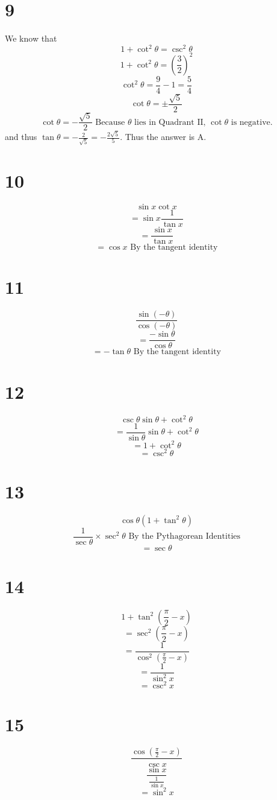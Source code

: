 \documentclass{article}
\theoremstyle{definition}
\newcommand{\?}{\stackrel{?}{=}}
\begin{document}
\section*{9}
We know that
\[ 1+\cot^2\theta=\csc^2\theta \]
\[ 1+\cot^2\theta=(\frac{3}{2})^2 \]
\[ \cot^2\theta=\frac{9}{4}-1=\frac{5}{4} \]
\[ \cot\theta=\pm\frac{\sqrt{5}}{2} \]
\[ \cot\theta=-\frac{\sqrt{5}}{2}\textrm{ Because $\theta$ lies in Quadrant II, $\cot\theta$ is negative.} \]
and thus $\tan\theta=-\frac{2}{\sqrt{5}}=-\frac{2\sqrt{5}}{5}$. Thus the answer is A.

\section*{10}
\[ \sin x\cot x \]
\[ =\sin x\frac{1}{\tan x} \]
\[ =\frac{\sin x}{\tan x} \]
\[ =\cos x\textrm{ By the tangent identity} \]

\section*{11}
\[ \frac{\sin(-\theta)}{\cos(-\theta)} \]
\[ =\frac{-\sin\theta}{\cos\theta} \]
\[ =-\tan\theta\textrm{ By the tangent identity} \]

\section*{12}
\[ \csc\theta\sin\theta+\cot^2\theta \]
\[ =\frac{1}{\sin\theta}\sin\theta+\cot^2\theta \]
\[ =1+\cot^2\theta \]
\[ =\csc^2\theta \]

\section*{13}
\[ \cos\theta(1+\tan^2\theta) \]
\[ \frac{1}{\sec\theta}\times \sec^2\theta\textrm{ By the Pythagorean Identities} \]
\[ =\sec\theta \]

\section*{14}
\[ 1+\tan^2\left(\frac{\pi}{2}-x\right) \]
\[ =\sec^2\left(\frac{\pi}{2}-x\right) \]
\[ =\frac{1}{\cos^2\left(\frac{\pi}{2}-x\right)} \]
\[ =\frac{1}{\sin^2x} \]
\[ =\csc^2 x \]

\section*{15}
\[ \dfrac{\cos\left(\frac{\pi}{2}-x\right)}{\csc x} \]
\[ \dfrac{\sin x}{\frac{1}{\sin x}} \]
\[ =\sin^2x \]
\end{document}
